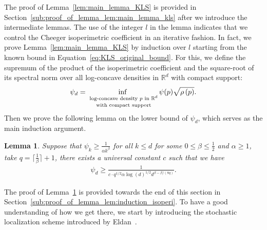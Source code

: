 \documentclass[11pt,twoside]{article}
\newcommand{\spec}[1]{\rho\parenth{#1}}
\newcommand{\isoperi}{\psi}
\theoremstyle{named}
\theoremstyle{plain}
\newtheorem{lemma}{Lemma}
\newcommand{\usedim}{\ensuremath{d}}
\newcommand{\dims}{\usedim}
\newcommand{\real}{\ensuremath{\mathbb{R}}}
\newcommand{\parenth}[1]{\left( #1 \right)}
\begin{document}
The proof of Lemma~\ref{lem:main_lemma_KLS} is provided in Section~\ref{sub:proof_of_lemma_lem:main_lemma_kls} after we introduce the intermediate lemmas. The use of the integer $l$ in the lemma indicates that we control the Cheeger isoperimetric coefficient in an iterative fashion. In fact, we prove Lemma~\ref{lem:main_lemma_KLS} by induction over $l$ starting from the known bound in Equation~\eqref{eq:KLS_original_bound}. For this, we define the supremum of the product of the isoperimetric coefficient and the square-root of its spectral norm over all log-concave densities in $\real^\dims$ with compact support:
\begin{align}
  \label{eq:def_inf_isoperi}
  \isoperi_\dims = \inf_{\text{ \shortstack{log-concave density $p$ in $\real^\dims$ \\ with compact support}}} \isoperi(p) \sqrt{\spec{p}}.
\end{align}
Then we prove the following lemma on the lower bound of $\isoperi_\dims$, which serves as the main induction argument.
\begin{lemma}
  \label{lem:induction_isoperi}
  Suppose that $\isoperi_k \geq \frac{1}{\alpha k^\beta}$ for all $k \leq \dims$ for some $0 \leq \beta \leq \frac{1}{2}$ and $\alpha \geq 1$, take $q = \lceil \frac{1}{\beta} \rceil + 1$, there exists a universal constant $c$ such that we have
  \begin{align*}
    \isoperi_\dims \geq \frac{1}{c \cdot q^{1/2} \alpha \log(\dims)^{1/2} \dims^{\beta - \beta / (8q) }}.
  \end{align*}
\end{lemma}
The proof of Lemma~\ref{lem:induction_isoperi} is provided towards the end of this section in Section~\ref{sub:proof_of_lemma_lem:induction_isoperi}. To have a good understanding of how we get there, we start by introducing the stochastic localization scheme introduced by Eldan~\cite{eldan2013thin}.
\end{document}
